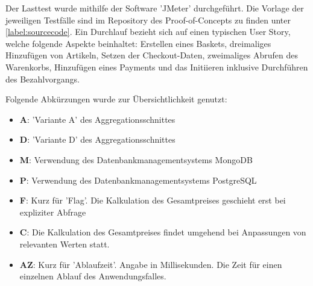 Der Lasttest wurde mithilfe der Software 'JMeter' durchgeführt. Die Vorlage der jeweiligen Testfälle sind im Repository des Proof-of-Concepts zu finden unter \ref{label:sourcecode}. Ein Durchlauf bezieht sich auf einen typischen User Story, welche folgende Aspekte beinhaltet: Erstellen eines Baskets, dreimaliges Hinzufügen von Artikeln, Setzen der Checkout-Daten, zweimaliges Abrufen des Warenkorbs, Hinzufügen eines Payments und das Initiieren inklusive Durchführen des Bezahlvorgangs. 

Folgende Abkürzungen wurde zur Übersichtlichkeit genutzt:
\begin{itemize}[noitemsep,nolistsep]
	\item \textbf{A}: 'Variante A' des Aggregationsschnittes
	\item \textbf{D}: 'Variante D' des Aggregationsschnittes
	\item \textbf{M}: Verwendung des Datenbankmanagementsystems MongoDB
	\item \textbf{P}: Verwendung des Datenbankmanagementsystems PostgreSQL
	\item \textbf{F}: Kurz für 'Flag'. Die Kalkulation des Gesamtpreises geschieht erst bei expliziter Abfrage
	\item \textbf{C}: Die Kalkulation des Gesamtpreises findet umgehend bei Anpassungen von relevanten Werten statt.
	\item \textbf{AZ}: Kurz für 'Ablaufzeit'. Angabe in Millisekunden. Die Zeit für einen einzelnen Ablauf des Anwendungsfalles. 
\end{itemize}


